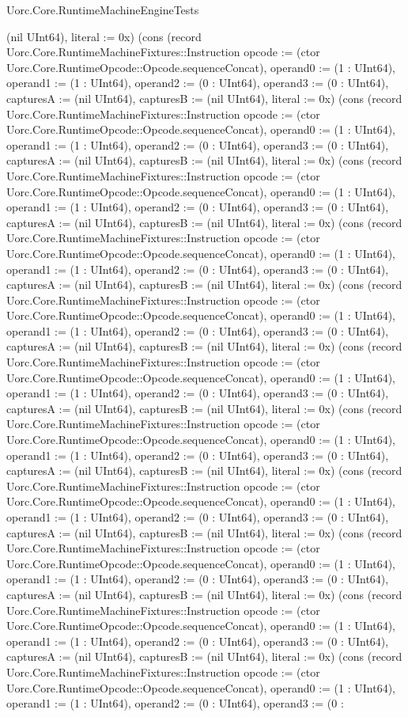 \begin{lexlean}{Uorc.Core.RuntimeMachineEngineTests}
\begin{semanticmodule}
{(nil UInt64), literal := 0x}) (cons (record Uorc.Core.RuntimeMachineFixtures::Instruction {opcode := (ctor Uorc.Core.RuntimeOpcode::Opcode.sequenceConcat), operand0 := (1 : UInt64), operand1 := (1 : UInt64), operand2 := (0 : UInt64), operand3 := (0 : UInt64), capturesA := (nil UInt64), capturesB := (nil UInt64), literal := 0x}) (cons (record Uorc.Core.RuntimeMachineFixtures::Instruction {opcode := (ctor Uorc.Core.RuntimeOpcode::Opcode.sequenceConcat), operand0 := (1 : UInt64), operand1 := (1 : UInt64), operand2 := (0 : UInt64), operand3 := (0 : UInt64), capturesA := (nil UInt64), capturesB := (nil UInt64), literal := 0x}) (cons (record Uorc.Core.RuntimeMachineFixtures::Instruction {opcode := (ctor Uorc.Core.RuntimeOpcode::Opcode.sequenceConcat), operand0 := (1 : UInt64), operand1 := (1 : UInt64), operand2 := (0 : UInt64), operand3 := (0 : UInt64), capturesA := (nil UInt64), capturesB := (nil UInt64), literal := 0x}) (cons (record Uorc.Core.RuntimeMachineFixtures::Instruction {opcode := (ctor Uorc.Core.RuntimeOpcode::Opcode.sequenceConcat), operand0 := (1 : UInt64), operand1 := (1 : UInt64), operand2 := (0 : UInt64), operand3 := (0 : UInt64), capturesA := (nil UInt64), capturesB := (nil UInt64), literal := 0x}) (cons (record Uorc.Core.RuntimeMachineFixtures::Instruction {opcode := (ctor Uorc.Core.RuntimeOpcode::Opcode.sequenceConcat), operand0 := (1 : UInt64), operand1 := (1 : UInt64), operand2 := (0 : UInt64), operand3 := (0 : UInt64), capturesA := (nil UInt64), capturesB := (nil UInt64), literal := 0x}) (cons (record Uorc.Core.RuntimeMachineFixtures::Instruction {opcode := (ctor Uorc.Core.RuntimeOpcode::Opcode.sequenceConcat), operand0 := (1 : UInt64), operand1 := (1 : UInt64), operand2 := (0 : UInt64), operand3 := (0 : UInt64), capturesA := (nil UInt64), capturesB := (nil UInt64), literal := 0x}) (cons (record Uorc.Core.RuntimeMachineFixtures::Instruction {opcode := (ctor Uorc.Core.RuntimeOpcode::Opcode.sequenceConcat), operand0 := (1 : UInt64), operand1 := (1 : UInt64), operand2 := (0 : UInt64), operand3 := (0 : UInt64), capturesA := (nil UInt64), capturesB := (nil UInt64), literal := 0x}) (cons (record Uorc.Core.RuntimeMachineFixtures::Instruction {opcode := (ctor Uorc.Core.RuntimeOpcode::Opcode.sequenceConcat), operand0 := (1 : UInt64), operand1 := (1 : UInt64), operand2 := (0 : UInt64), operand3 := (0 : UInt64), capturesA := (nil UInt64), capturesB := (nil UInt64), literal := 0x}) (cons (record Uorc.Core.RuntimeMachineFixtures::Instruction {opcode := (ctor Uorc.Core.RuntimeOpcode::Opcode.sequenceConcat), operand0 := (1 : UInt64), operand1 := (1 : UInt64), operand2 := (0 : UInt64), operand3 := (0 : UInt64), capturesA := (nil UInt64), capturesB := (nil UInt64), literal := 0x}) (cons (record Uorc.Core.RuntimeMachineFixtures::Instruction {opcode := (ctor Uorc.Core.RuntimeOpcode::Opcode.sequenceConcat), operand0 := (1 : UInt64), operand1 := (1 : UInt64), operand2 := (0 : UInt64), operand3 := (0 : UInt64), capturesA := (nil UInt64), capturesB := (nil UInt64), literal := 0x}) (cons (record Uorc.Core.RuntimeMachineFixtures::Instruction {opcode := (ctor Uorc.Core.RuntimeOpcode::Opcode.sequenceConcat), operand0 := (1 : UInt64), operand1 := (1 : UInt64), operand2 := (0 : UInt64), operand3 := (0 : }
\end{semanticmodule}
\end{lexlean}
